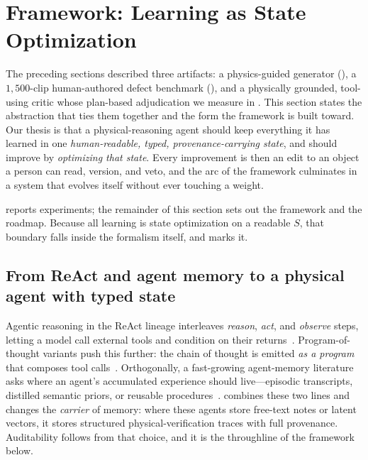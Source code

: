 \section{Framework: Learning as State Optimization}\label{sec:framework}

The preceding sections described three artifacts: a
physics-guided generator (), a $1{,}500$-clip human-authored
defect benchmark (), and a physically grounded, tool-using
critic whose plan-based adjudication we measure in . This section states the
abstraction that ties them together and the form the framework is built toward. Our thesis is that a physical-reasoning
agent should keep everything it has learned in one
\emph{human-readable, typed, provenance-carrying state}, and should improve by
\emph{optimizing that state}. Every improvement
is then an edit to an object a person can read, version, and veto, and the arc of
the framework culminates in a system that evolves itself without ever touching a
weight.

 reports experiments; the remainder of this section
sets out the framework and the roadmap. Because all learning is state optimization on a readable
$S$, that boundary falls inside the formalism itself, and  marks it.

\subsection{From ReAct and agent memory to a physical agent with typed state}
\label{sec:framework:genealogy}

Agentic reasoning in the ReAct lineage interleaves \emph{reason}, \emph{act}, and
\emph{observe} steps, letting a model call external tools and condition on their
returns~\cite{react2023,reflexion2023,critic2024}. Program-of-thought variants
push this further: the chain of thought is emitted \emph{as a program} that
composes tool calls~\cite{rewoo2023,llmcompiler2024,vipergpt2023,visprog2023,%
toolformer2023,hugginggpt2023}. Orthogonally, a fast-growing agent-memory
literature asks where an agent's accumulated experience should live---episodic
transcripts, distilled semantic priors, or reusable
procedures~\cite{contexttraining2026,reasoningbank2026,explicitmem2026,%
plugmem2026,vilomem2026,amem2025,agentmemsurvey2024,m3agent2025,hindsight2026,%
aimeetsbrain2026}. \PhyReAct{} combines these two lines and changes the \emph{carrier} of memory: where these
agents store free-text notes or latent vectors, it stores structured physical-verification traces
with full provenance. Auditability follows from that choice, and it is the throughline of the
framework below.

